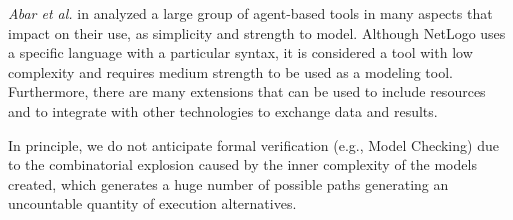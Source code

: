 \textit{Abar et al.} in \cite{ABAR201713} analyzed a large group of agent-based tools in many aspects that impact on their use, as simplicity and strength to model. Although NetLogo uses a specific language with a particular syntax, it is considered a tool with low complexity and requires medium strength to be used as a modeling tool. Furthermore, there are many extensions that can be used to include resources and to  integrate with other technologies to exchange data and results.

In principle, we do not anticipate formal verification (e.g., Model Checking) due to the combinatorial explosion caused by the inner complexity of the models created, which generates a huge number of possible paths generating an uncountable quantity of execution alternatives. 





%








